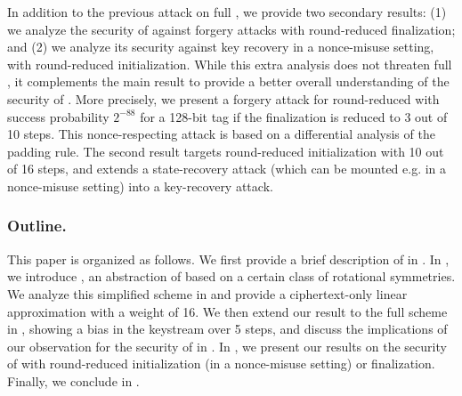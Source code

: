 In addition to the previous attack on full \MORUS, we provide two secondary results: (1) we analyze the security of \MORUS against forgery attacks with round-reduced finalization; and (2) we analyze its security against key recovery in a nonce-misuse setting, with round-reduced initialization.
While this extra analysis does not threaten full \MORUS, it complements the main result to provide a better overall understanding of the security of \MORUS.
More precisely, we present a forgery attack for round-reduced \MORUS[1280] with success probability $2^{-88}$ for a 128-bit tag if the finalization is reduced to 3 out of 10 steps. This nonce-respecting attack is based on a differential analysis of the padding rule.
The second result targets round-reduced initialization with 10 out of 16 steps, and extends a state-recovery attack (which can be mounted e.g. in a nonce-misuse setting) into a key-recovery attack.

\subsubsection*{Outline.}
This paper is organized as follows.
We first provide a brief description of \MORUS in .
In , we introduce \MiniMORUS, an abstraction of \MORUS based on a certain class of rotational symmetries.
We analyze this simplified scheme in  and provide a ciphertext-only linear approximation with a weight of 16.
We then extend our result to the full scheme in , showing a bias in the keystream over 5 steps,
and discuss the implications of our observation for the security of \MORUS in .
In , we present our results on the security of \MORUS with round-reduced initialization (in a nonce-misuse setting) or finalization.
Finally, we conclude in .

